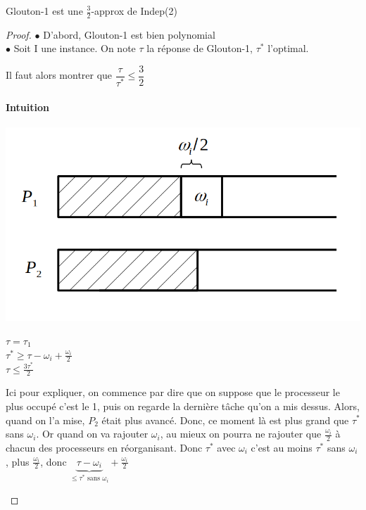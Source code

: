 \begin{theorem}
	Glouton-1 est une $\frac{3}{2}$-approx de Indep(2)
\end{theorem}

\begin{proof}
	$\bullet$ D'abord, Glouton-1 est bien polynomial\\
	
	$\bullet$ Soit I une instance. On note $\tau$ la réponse de Glouton-1, $\tau^*$ l'optimal.
	
	Il faut alors montrer que $\dfrac{\tau}{\tau^*} \leq \dfrac{3}{2}$
	
	\paragraph{Intuition}\begin{minipage}{0.4\linewidth}
	\includegraphics[scale=0.2]{Developpements/Glouton indep 2/instance2.png}\end{minipage}
	\begin{minipage}{0.4\linewidth}
		$\tau = \tau_1$ \\ $\tau^* \geq \tau - \omega_i + \frac{\omega_i}{2}$\\$ \tau \leq \frac{3\tau^*}{2}$
	\end{minipage}
	
	\begin{com}
		Ici pour expliquer, on commence par dire que on suppose que le processeur le plus occupé c'est le 1, puis on regarde la dernière tâche qu'on a mis dessus. Alors, quand on l'a mise, $P_2$ était plus avancé. Donc, ce moment là est plus grand que $\tau^*$ sans $\omega_i$. Or quand on va rajouter $\omega_i$, au mieux on pourra ne rajouter que $\frac{\omega_i}{2}$ à chacun des processeurs en réorganisant. Donc $\tau^*$ avec $\omega_i$ c'est au moins $\tau^*$ sans $\omega_i$, plus $\frac{\omega_i}{2}$, donc $\underset{\leq \tau^* \text{ sans } \omega_i}{\underbrace{\tau - \omega_i}} + \frac{\omega_i}{2}$
	\end{com}
	

\end{proof}
